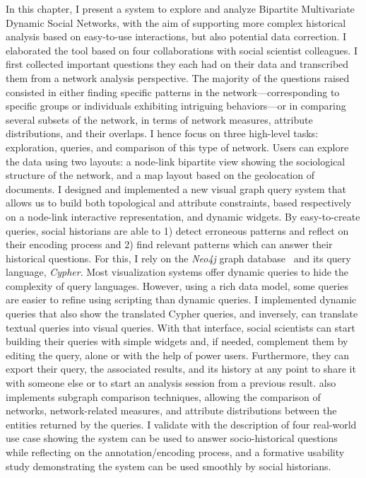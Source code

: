 In this chapter, I present a \va system to explore and analyze Bipartite Multivariate Dynamic Social Networks, with the aim of supporting more complex historical analysis based on easy-to-use interactions, but also potential data correction.
I elaborated the tool based on four collaborations with social scientist colleagues.
I first collected important questions they each had on their data and transcribed them from a network analysis perspective.
The majority of the questions raised consisted in either finding specific patterns in the network---corresponding to specific groups or individuals exhibiting intriguing behaviors---or in comparing several subsets of the network, in terms of network measures, attribute distributions, and their overlaps.
I hence focus on three high-level tasks: exploration, queries, and comparison of this type of network.
Users can explore the data using two layouts: a node-link bipartite view showing the sociological structure of the network, and a map layout based on the geolocation of documents.
I designed and implemented a new visual graph query system that allows us to build both topological and attribute constraints, based respectively on a node-link interactive representation, and dynamic widgets.
By easy-to-create queries, social historians are able to 1) detect erroneous patterns and reflect on their encoding process and 2) find relevant patterns which can answer their historical questions.
For this, I rely on the \emph{Neo4j} graph database~\cite{neo4j} and its query language, \emph{Cypher}.
Most visualization systems offer dynamic queries to hide the complexity of query languages.
However, using a rich data model, some queries are easier to refine using scripting than dynamic queries.
I implemented dynamic queries that also show the translated Cypher queries, and inversely, can translate textual queries into visual queries.
With that interface, social scientists can start building their queries with simple widgets and, if needed, complement them by editing the query, alone or with the help of power users.
Furthermore, they can export their query, the associated results, and its history at any point to share it with someone else or to start an analysis session from a previous result.
\name also implements subgraph comparison techniques, allowing the comparison of networks, network-related measures, and attribute distributions between the entities returned by the queries.
I validate \combinet with the description of four real-world use case showing the system can be used to answer socio-historical questions while reflecting on the annotation/encoding process, and a formative usability study demonstrating the system can be used smoothly by social historians.

